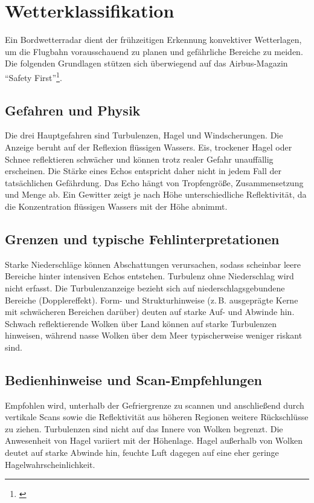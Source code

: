 \section{Wetterklassifikation}

Ein Bordwetterradar dient der frühzeitigen Erkennung konvektiver Wetterlagen, 
um die Flugbahn vorausschauend zu planen und gefährliche Bereiche zu meiden. 
Die folgenden Grundlagen stützen sich überwiegend auf das Airbus-Magazin 
\enquote{Safety First}\footnote{ \parencite{marconnet2016optimumWeatherRadar}}.

\subsection*{Gefahren und Physik}
Die drei Hauptgefahren sind Turbulenzen, Hagel und Windscherungen. Die Anzeige 
beruht auf der Reflexion flüssigen Wassers. Eis, trockener Hagel oder Schnee 
reflektieren schwächer und können trotz realer Gefahr unauffällig erscheinen. 
Die Stärke eines Echos entspricht daher nicht in jedem Fall der tatsächlichen Gefährdung. 
Das Echo hängt von Tropfengröße, Zusammensetzung und Menge ab. Ein Gewitter zeigt je 
nach Höhe unterschiedliche Reflektivität, da die Konzentration flüssigen Wassers mit der Höhe abnimmt.

\subsection*{Grenzen und typische Fehlinterpretationen}
Starke Niederschläge können Abschattungen verursachen, sodass scheinbar leere 
Bereiche hinter intensiven Echos entstehen. Turbulenz ohne Niederschlag wird nicht erfasst. 
Die Turbulenzanzeige bezieht sich auf niederschlagsgebundene Bereiche (Dopplereffekt). 
Form- und Strukturhinweise (z.\,B. ausgeprägte Kerne mit schwächeren Bereichen darüber) 
deuten auf starke Auf- und Abwinde hin. Schwach reflektierende Wolken über Land können auf starke Turbulenzen 
hinweisen, während nasse Wolken über dem Meer typischerweise weniger riskant sind.

\subsection*{Bedienhinweise und Scan-Empfehlungen}
Empfohlen wird, unterhalb der Gefriergrenze zu scannen und anschließend durch vertikale 
Scans sowie die Reflektivität aus höheren Regionen weitere Rückschlüsse zu ziehen. 
Turbulenzen sind nicht auf das Innere von Wolken begrenzt. Die Anwesenheit von Hagel 
variiert mit der Höhenlage. Hagel außerhalb von Wolken deutet auf starke Abwinde hin, 
feuchte Luft dagegen auf eine eher geringe Hagelwahrscheinlichkeit.

